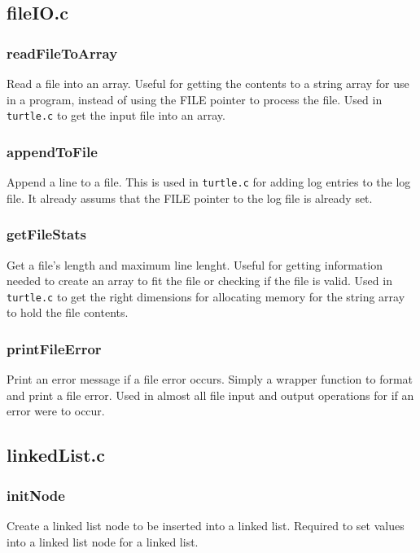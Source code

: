 \documentclass[a4paper, 12pt, titlepage]{article}
\newcommand{\code}[1]{\small\texttt{#1}\normalsize}
\begin{document}
\pagebreak
\subsection{fileIO.c}
\subsubsection{readFileToArray}

Read a file into an array. Useful for getting the contents to a string 
array for use in a program, instead of using the FILE pointer to process 
the file. Used in \code{turtle.c} to get the input file into an array.

\subsubsection{appendToFile}

Append a line to a file. This is used in \code{turtle.c} for adding log 
entries to the log file. It already assums that the FILE pointer to the 
log file is already set.

\subsubsection{getFileStats}

Get a file's length and maximum line lenght. Useful for getting information 
needed to create an array to fit the file or checking if the file is valid. 
Used in \code{turtle.c} to get the right dimensions for allocating memory 
for the string array to hold the file contents.

\subsubsection{printFileError}

Print an error message if a file error occurs. Simply a wrapper function to 
format and print a file error. Used in almost all file input and output 
operations for if an error were to occur.

\pagebreak
\subsection{linkedList.c}
\subsubsection{initNode}

Create a linked list node to be inserted into a linked list. Required to 
set values into a linked list node for a linked list.
\end{document}
